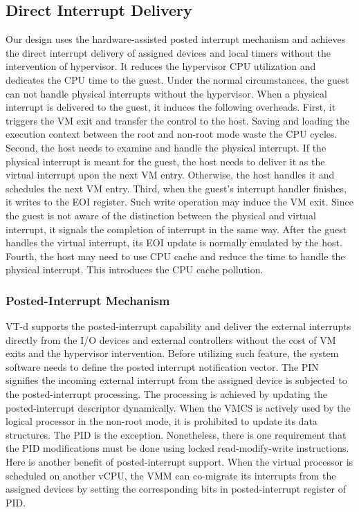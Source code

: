 \subsection{Direct Interrupt Delivery}
Our design uses the hardware-assisted posted interrupt
mechanism and achieves the direct interrupt delivery of
assigned devices and local timers without the intervention of
hypervisor. It reduces the hypervisor CPU utilization and
dedicates the CPU time to the guest. Under the normal
circumstances, the guest can not handle physical interrupts
without the hypervisor. When a physical interrupt is delivered
to the guest, it induces the following overheads. First, it
triggers the VM exit and transfer the control to the host.
Saving and loading the execution context between the root and
non-root mode waste the CPU cycles. Second, the host needs to
examine and handle the physical interrupt. If the physical
interrupt is meant for the guest, the host needs to deliver it
as the virtual interrupt upon the next VM entry. Otherwise,
the host handles it and schedules the next VM entry. Third,
when the guest's interrupt handler finishes, it writes to the
EOI register. Such write operation may induce the VM exit.
Since the guest is not aware of the distinction between the
physical and virtual interrupt, it signals the completion of
interrupt in the same way. After the guest handles the virtual
interrupt, its EOI update is normally emulated by the host.
Fourth, the host may need to use CPU cache and reduce the time
to handle the physical interrupt. This introduces the CPU
cache pollution.

\subsubsection{Posted-Interrupt Mechanism}
VT-d supports the posted-interrupt capability and deliver the
external interrupts directly from the I/O devices and external
controllers without the cost of VM exits and the hypervisor
intervention. Before utilizing such feature, the system
software needs to define the posted interrupt notification
vector. The PIN signifies the incoming external interrupt from
the assigned device is subjected to the posted-interrupt
processing. The processing is achieved by updating the
posted-interrupt descriptor dynamically. When the VMCS is
actively used by the logical processor in the non-root mode,
it is prohibited to update its data structures. The PID is the
exception. Nonetheless, there is one requirement that the PID
modifications must be done using locked read-modify-write
instructions. Here is another benefit of posted-interrupt
support. When the virtual processor is scheduled on another
vCPU, the VMM can co-migrate its interrupts from the assigned
devices by setting the corresponding bits in posted-interrupt
register of PID.

